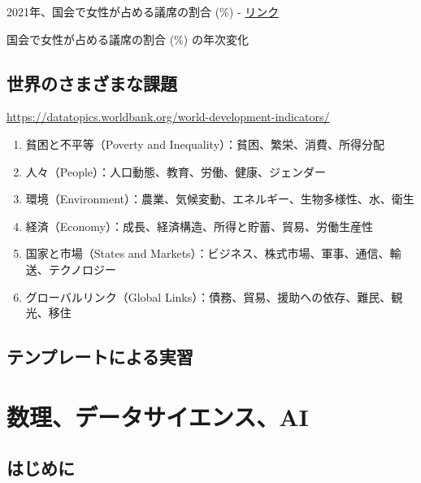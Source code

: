 \documentclass[
]{bxjsbook}
\providecommand{\tightlist}{%
  \setlength{\itemsep}{0pt}\setlength{\parskip}{0pt}}
\theoremstyle{definition}
\theoremstyle{definition}
\theoremstyle{definition}
\theoremstyle{definition}
\theoremstyle{remark}
\begin{document}
2021年、国会で女性が占める議席の割合 (\%) - \href{https://data.worldbank.org/indicator/SG.GEN.PARL.ZS?locations=JP-GB-RU-FR-CN-US-UA-DE\&start=2021\&end=2021\&view=bar}{リンク}

国会で女性が占める議席の割合 (\%) の年次変化

\hypertarget{ux4e16ux754cux306eux3055ux307eux3056ux307eux306aux8ab2ux984c}{%
\subsection{世界のさまざまな課題}\label{ux4e16ux754cux306eux3055ux307eux3056ux307eux306aux8ab2ux984c}}

\url{https://datatopics.worldbank.org/world-development-indicators/}

\begin{enumerate}
\def\labelenumi{\arabic{enumi}.}
\tightlist
\item
  貧困と不平等（Poverty and Inequality）：貧困、繁栄、消費、所得分配
\item
  人々（People）：人口動態、教育、労働、健康、ジェンダー
\item
  環境（Environment）：農業、気候変動、エネルギー、生物多様性、水、衛生
\item
  経済（Economy）：成長、経済構造、所得と貯蓄、貿易、労働生産性
\item
  国家と市場（States and Markets）：ビジネス、株式市場、軍事、通信、輸送、テクノロジー
\item
  グローバルリンク（Global Links）：債務、貿易、援助への依存、難民、観光、移住
\end{enumerate}

\hypertarget{ux30c6ux30f3ux30d7ux30ecux30fcux30c8ux306bux3088ux308bux5b9fux7fd2}{%
\subsection{テンプレートによる実習}\label{ux30c6ux30f3ux30d7ux30ecux30fcux30c8ux306bux3088ux308bux5b9fux7fd2}}

\hypertarget{introai}{%
\section{数理、データサイエンス、AI}\label{introai}}

\hypertarget{ux306fux3058ux3081ux306b-3}{%
\subsection{はじめに}\label{ux306fux3058ux3081ux306b-3}}
\end{document}
